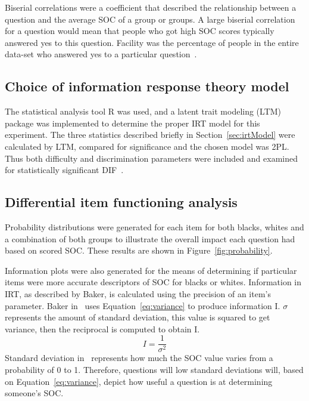 \documentclass{sig-alternate}
\begin{document}
Biserial correlations were a coefficient that described the relationship between a question and the average SOC of a group or groups. A large biserial correlation for a question would mean that people who got high SOC scores typically answered yes to this question. Facility was the percentage of people in the entire data-set who answered yes to a particular question~\cite{biserial:2006}.

\subsection{Choice of information response theory model}
The statistical analysis tool R was used, and a latent trait modeling (LTM) package was implemented to determine the proper IRT model for this experiment. The three statistics described briefly in Section~\ref{sec:irtModel} were calculated by LTM, compared for significance and the chosen model was 2PL. Thus both difficulty and discrimination parameters were included and examined for statistically significant DIF~\cite{disparities:2009}.

\subsection{Differential item functioning analysis}
Probability distributions were generated for each item for both blacks, whites and a combination of both groups to illustrate the overall impact each question had based on scored SOC. These results are shown in Figure~\ref{fig:probability}.


Information plots were also generated for the means of determining if particular items were more accurate descriptors of SOC for blacks or whites. Information in IRT, as described by Baker, is calculated using the precision of an item's parameter. Baker in~\cite{irt:2001} uses Equation~\ref{eq:variance} to produce information I. $\sigma$ represents the amount of standard deviation, this value is squared to get variance, then the reciprocal is computed to obtain I.
\begin{equation}
\label{eq:variance}
I =  \frac{1}{  \sigma ^{2} } 
\end{equation}
Standard deviation in~\cite{disparities:2009} represents how much the SOC value varies from a probability of 0 to 1. Therefore, questions will low standard deviations will, based on Equation~\ref{eq:variance}, depict how useful a question is at determining someone's SOC. 
\end{document}
